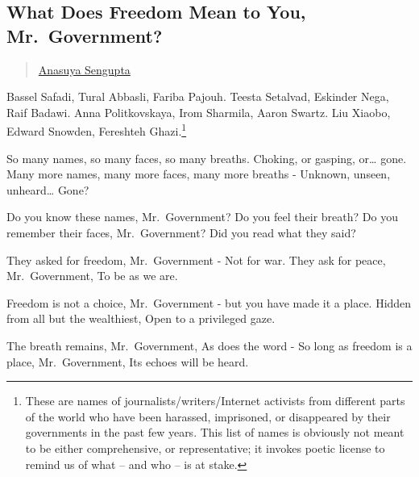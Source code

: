 \subsection{What Does Freedom Mean to You,
Mr.~Government?}\label{what-does-freedom-mean-to-you-mr.government}

\begin{quote}
\hyperlink{anasuya-sengupta}{Anasuya Sengupta}
\end{quote}

Bassel Safadi, Tural Abbasli, Fariba Pajouh. Teesta Setalvad, Eskinder
Nega, Raif Badawi. Anna Politkovskaya, Irom Sharmila, Aaron Swartz. Liu
Xiaobo, Edward Snowden, Fereshteh Ghazi.\footnote{These are names of
  journalists/writers/Internet activists from different parts of the
  world who have been harassed, imprisoned, or disappeared by their
  governments in the past few years. This list of names is obviously not
  meant to be either comprehensive, or representative; it invokes poetic
  license to remind us of what -- and who -- is at stake.}

So many names, so many faces, so many breaths. Choking, or gasping,
or\ldots{} gone. Many more names, many more faces, many more breaths -
Unknown, unseen, unheard\ldots{} Gone?

Do you know these names, Mr.~Government? Do you feel their breath? Do
you remember their faces, Mr.~Government? Did you read what they said?

They asked for freedom, Mr.~Government - Not for war. They ask for
peace, Mr.~Government, To be as we are.

Freedom is not a choice, Mr.~Government - but you have made it a place.
Hidden from all but the wealthiest, Open to a privileged gaze.

The breath remains, Mr.~Government, As does the word - So long as
freedom is a place, Mr.~Government, Its echoes will be heard.

